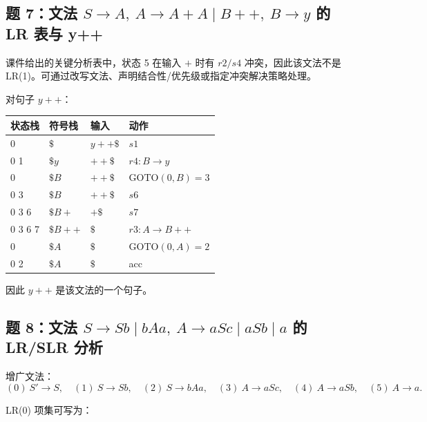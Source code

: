 \documentclass[UTF8,fontset=none,11pt]{ctexart}
\newcommand{\GOTO}{\ensuremath{\mathrm{GOTO}}}
\begin{document}
\subsection*{题 7：文法 \texorpdfstring{\(S\to A,\ A\to A+A\mid B++,\ B\to y\)}{S->A} 的 LR 表与 y++}

课件给出的关键分析表中，状态 5 在输入 \(+\) 时有 \(r2/s4\) 冲突，因此该文法不是 LR(1)。可通过改写文法、声明结合性/优先级或指定冲突解决策略处理。

对句子 \(y++\)：

\begin{center}
\small
\begin{tabular}{llll}
\toprule
状态栈 & 符号栈 & 输入 & 动作 \\
\midrule
0 & \(\$\) & \(y++\$\) & \(s1\) \\
0 1 & \(\$y\) & \(++\$\) & \(r4: B\to y\) \\
0 & \(\$B\) & \(++\$\) & \(\GOTO(0,B)=3\) \\
0 3 & \(\$B\) & \(++\$\) & \(s6\) \\
0 3 6 & \(\$B+\) & \(+\$\) & \(s7\) \\
0 3 6 7 & \(\$B++\) & \(\$\) & \(r3: A\to B++\) \\
0 & \(\$A\) & \(\$\) & \(\GOTO(0,A)=2\) \\
0 2 & \(\$A\) & \(\$\) & acc \\
\bottomrule
\end{tabular}
\end{center}

因此 \(y++\) 是该文法的一个句子。

\subsection*{题 8：文法 \texorpdfstring{\(S\to Sb\mid bAa,\ A\to aSc\mid aSb\mid a\)}{S grammar} 的 LR/SLR 分析}

增广文法：
\[
(0)\ S'\to S,\quad
(1)\ S\to Sb,\quad
(2)\ S\to bAa,\quad
(3)\ A\to aSc,\quad
(4)\ A\to aSb,\quad
(5)\ A\to a.
\]

LR(0) 项集可写为：
\end{document}
